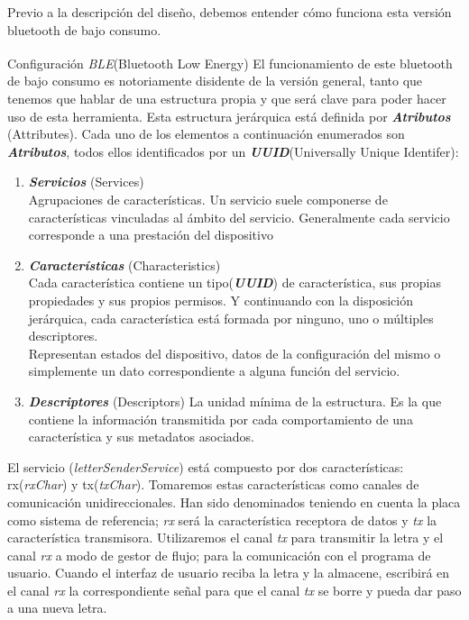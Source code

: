 Previo a la descripción del diseño, debemos entender cómo funciona esta versión
bluetooth de bajo consumo.

\begin{teoria}{Configuración \textit{BLE}(Bluetooth Low Energy)\textsuperscript{\cite{BLEAndroid, BLEguide, BLEOreilly}}}
    \color{mitexto}
    El funcionamiento de este bluetooth de bajo consumo es notoriamente
    disidente de la versión general, tanto que tenemos que hablar de una
    estructura propia y que será clave para poder hacer uso de esta
    herramienta.
    Esta estructura jerárquica está definida por \textbf{\textit{Atributos}}
    {\footnotesize(Attributes)}.
    Cada uno de los elementos a continuación enumerados son
    \textbf{\textit{Atributos}}, todos ellos identificados por un
    \textbf{\textit{UUID}}{\footnotesize(Universally Unique Identifer)}:
        \begin{enumerate}
            \itemsep0em 
            \item \textbf{\textit{Servicios}} {\footnotesize(Services)}\\
            {\small Agrupaciones de características. Un servicio suele
            componerse de características vinculadas al ámbito del servicio.
            Generalmente cada servicio corresponde a una prestación del
            dispositivo}
            \item \textbf{\textit{Características}} {\footnotesize(Characteristics)}\\
            {\small Cada característica contiene un tipo(\textbf{\textit{UUID}})
            de característica, sus propias propiedades y sus
            propios permisos. Y continuando con
            la disposición jerárquica, cada característica está formada
            por ninguno, uno o múltiples descriptores.\\
            Representan estados del dispositivo, datos de la configuración
            del mismo o simplemente un dato correspondiente a alguna
            función del servicio.}
            \item \textbf{\textit{Descriptores}} {\footnotesize(Descriptors)}
            {\small La unidad mínima de la estructura. Es la que contiene
            la información transmitida por cada comportamiento de una
            característica y sus metadatos asociados.}
        \end{enumerate}
    \end{teoria}


El servicio (\textit{letterSenderService}) está compuesto por dos características:
rx(\textit{rxChar}) y tx(\textit{txChar}). Tomaremos estas características
como canales de comunicación unidireccionales. Han sido denominados teniendo
en cuenta la placa como
sistema de referencia; \textit{rx} será la característica receptora de datos y 
\textit{tx} la característica transmisora.\newline
Utilizaremos el canal \textit{tx} para transmitir la letra y el canal \textit{rx}
a modo de gestor de flujo; para la comunicación con el programa de usuario. Cuando
el interfaz de usuario reciba la letra y la almacene, escribirá en el canal
\textit{rx} la correspondiente señal para que el canal \textit{tx} se borre
y pueda dar paso a una nueva letra.

